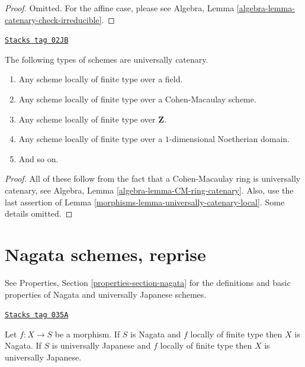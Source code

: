 \begin{proof}
Omitted. For the affine case, please see
Algebra, Lemma \ref{algebra-lemma-catenary-check-irreducible}.
\end{proof}

\begin{lemma}[Ubiquity uc]
\label{morphisms-lemma-ubiquity-uc}
\href{https://stacks.math.columbia.edu/tag/02JB}{\texttt{Stacks tag 02JB}}

The following types of schemes are universally catenary.
\begin{enumerate}
\item Any scheme locally of finite type over a field.
\item Any scheme locally of finite type over a Cohen-Macaulay scheme.
\item Any scheme locally of finite type over $\mathbf{Z}$.
\item Any scheme locally of finite type over a $1$-dimensional
Noetherian domain.
\item And so on.
\end{enumerate}
\end{lemma}

\begin{proof}

All of these follow from the fact that a
Cohen-Macaulay ring is universally catenary, see
Algebra, Lemma \ref{algebra-lemma-CM-ring-catenary}.
Also, use the last assertion of
Lemma \ref{morphisms-lemma-universally-catenary-local}.
Some details omitted.
\end{proof}

\section{Nagata schemes, reprise}
\label{morphisms-section-nagata}
See Properties, Section \ref{properties-section-nagata} for the definitions
and basic properties of Nagata and universally Japanese schemes.

\begin{lemma}
\label{morphisms-lemma-finite-type-nagata}
\href{https://stacks.math.columbia.edu/tag/035A}{\texttt{Stacks tag 035A}}

Let $f : X \to S$ be a morphism.
If $S$ is Nagata and $f$ locally of finite type then $X$ is Nagata.
If $S$ is universally Japanese
and $f$ locally of finite type then $X$ is universally Japanese.
\end{lemma}

